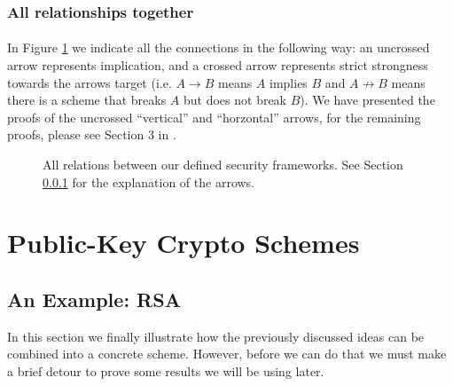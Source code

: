\documentclass{article}
\theoremstyle{definition}
\begin{document}
\subsubsection{All relationships together}
\label{sec:allrelations}
\paragraph{} In Figure \ref{fig:secrelations} we indicate all the connections in the following way:
an uncrossed arrow represents implication, and a crossed arrow represents strict
strongness towards the arrows target (i.e. $A \rightarrow B$ means $A$ implies
$B$ and $A \not\rightarrow B$ means there is a scheme that breaks $A$ but does
not break $B$). We have presented the proofs of the uncrossed ``vertical'' and
``horzontal'' arrows, for the remaining proofs, please see Section 3 in \cite{bellaresecurityrelations}.
\begin{figure}
  \centering
  \caption{All relations between our defined security frameworks. See Section
    \ref{sec:allrelations} for the explanation of the arrows.}
  \label{fig:secrelations}
\end{figure}
\section{Public-Key Crypto Schemes}
\subsection{An Example: RSA}
In this section we finally illustrate how the previously discussed ideas can be
combined into a concrete scheme. However, before we can do that we must make a
brief detour to prove some results we will be using later.
\end{document}
